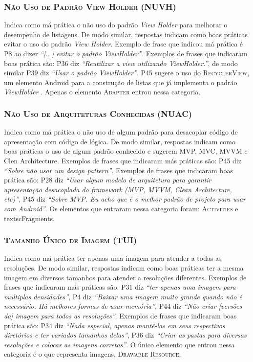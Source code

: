 \subsubsection{\textsc{Não Uso de Padrão View Holder (NUVH)}}
Indica como má prática o não uso do padrão \textit{View Holder} \cite{AluraViewHolder} para melhorar o desempenho de listagens. De modo similar, respostas indicam como boas práticas evitar o uso do padrão \textit{View Holder}. Exemplo de frase que indicou má prática é P8 ao dizer \textit{``[...] evitar o padrão ViewHolder''}. Exemplos de frases que indicaram boas prática são: P36 diz \textit{``Reutilizar a view utilizando ViewHolder.''}, de modo similar P39 diz \textit{``Usar o padrão ViewHolder''}. P45 sugere o uso do \textsc{RecyclerView}, um elemento Android para a construção de listas que já implementa o padrão \textit{ViewHolder} \cite{AluraViewHolder}. Apenas o elemento \textsc{Adapter} entrou nessa categoria. 

\subsubsection{\textsc{Não Uso de Arquiteturas Conhecidas (NUAC)}}
Indica como má prática o não uso de algum padrão para desacoplar código de apresentação com código de lógica. De modo similar, respostas indicam como boas práticas o uso de algum padrão conhecido e sugerem MVP, MVC, MVVM e Clen Architecture. Exemplos de frases que indicaram más práticas são: P45 diz \textit{``Sobre não usar um design pattern''}. Exemplos de frases que indicaram boas prática são: P28 diz \textit{``Usar algum modelo de arquitetura para garantir apresentação desacoplada do framework (MVP, MVVM, Clean Architecture, etc)''}, P45 diz \textit{``Sobre MVP. Eu acho que é o melhor padrão de projeto para usar com Android''}. Os elementos que entraram nessa categoria foram: \textsc{Activities} e textsc{Fragments}. 

\subsubsection{\textsc{Tamanho Único de Imagem (TUI)}}
Indica como má prática ter apenas uma imagem para atender a todas as resoluções. De modo similar, respostas indicam como boas práticas ter a mesma imagem em diversos tamanhos para atender a resoluções diferentes. Exemplos de frases que indicaram más práticas são: P31 diz \textit{``ter apenas uma imagem para multiplas densidades''}, P4 diz \textit{``Baixar uma imagem muito grande quando não é necessário. Há melhores formas de usar memória''}, P44 diz \textit{``Não criar [versões da] imagem para todos as resoluções''}. Exemplos de frases que indicaram boas prática são: P34 diz \textit{``Nada especial, apenas mantê-las em seus respectivos diretórios e ter variados tamanhos delas''}, P36 diz \textit{``Criar as pastas para diversas resoluções e colocar as imagens corretas''}. O único elemento que entrou nessa categoria é o que representa imagens, \textsc{Drawable Resource}.

